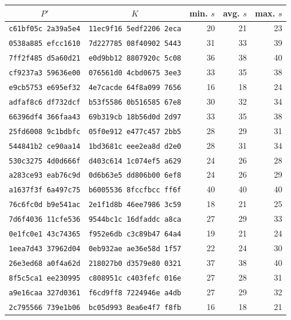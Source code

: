 \begin{table}[ht]
\begin{center}
\begin{tabular}{|c|c|r|r|r|}
\hline
$P'$ & $K$ & min. $s$ & avg. $s$ & max. $s$\\
\hline
\texttt{c61bf05c 2a39a5e4} & \texttt{11ec9f16 5edf2206 2eca} & 20 & 21 & 23\\  
\texttt{0538a885 efcc1610} & \texttt{7d227785 08f40902 5443} & 31 & 33 & 39\\  
\texttt{7ff2f485 d5a60d21} & \texttt{e0d9bb12 8807920c 5c08} & 36 & 38 & 40\\  
\texttt{cf9237a3 59636e00} & \texttt{076561d0 4cbd0675 3ee3} & 33 & 35 & 38\\  
\texttt{e9cb5753 e695ef32} & \texttt{4e7cacde 64f8a099 7656} & 16 & 18 & 24\\  
\texttt{adfaf8c6 df732dcf} & \texttt{b53f5586 0b516585 67e8} & 30 & 32 & 34\\  
\texttt{66396df4 366faa43} & \texttt{69b319cb 18b56d0d 2d97} & 33 & 35 & 38\\  
\texttt{25fd6008 9c1bdbfc} & \texttt{05f0e912 e477c457 2bb5} & 28 & 29 & 31\\  
\texttt{544841b2 ce90aa14} & \texttt{1bd3681c eee2ea8d d2e0} & 28 & 31 & 34\\  
\texttt{530c3275 4d0d666f} & \texttt{d403c614 1c074ef5 a629} & 24 & 26 & 28\\  
\texttt{a283ce93 eab76c9d} & \texttt{0d6b63e5 dd806b00 6ef8} & 24 & 26 & 29\\  
\texttt{a1637f3f 6a497c75} & \texttt{b6005536 8fccfbcc ff6f} & 40 & 40 & 40\\  
\texttt{76c6fc0d b9e541ac} & \texttt{2e1f1d8b 46ee7986 3c59} & 18 & 21 & 25\\  
\texttt{7d6f4036 11cfe536} & \texttt{9544bc1c 16dfaddc a8ca} & 27 & 29 & 33\\  
\texttt{0e1fc0e1 43c74365} & \texttt{f952e6db c3c89b47 64a4} & 19 & 21 & 24\\  
\texttt{1eea7d43 37962d04} & \texttt{0eb932ae ae36e58d 1f57} & 22 & 24 & 30\\  
\texttt{26e3ed68 a0f4a62d} & \texttt{218027b0 d3579e80 0321} & 37 & 38 & 40\\  
\texttt{8f5c5ca1 ee230995} & \texttt{c808951c c403fefc 016e} & 27 & 28 & 31\\  
\texttt{a9e16caa 327d0361} & \texttt{f6cd9ff8 7224946e a4db} & 27 & 29 & 32\\  
\texttt{2c795566 739e1b06} & \texttt{bc05d993 8ea6e4f7 f8fb} & 16 & 18 & 21\\  

\end{tabular}
\end{center}
\end{table}
